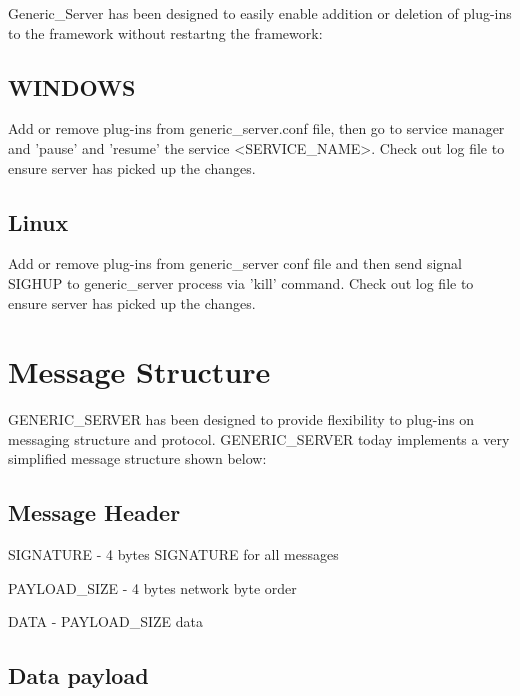 \begin{DoxyVerb}Generic_Server has been designed to easily enable addition or deletion of
plug-ins to the framework without restartng the framework:
\end{DoxyVerb}
\hypertarget{index_wi}{}\subsection{W\-I\-N\-D\-O\-W\-S}\label{index_wi}
\begin{DoxyVerb}    Add or remove plug-ins from generic_server.conf file, then go to service manager and 
    'pause' and 'resume' the service <SERVICE_NAME>. Check out log file to ensure server has
    picked up the changes.
\end{DoxyVerb}
\hypertarget{index_lii}{}\subsection{Linux}\label{index_lii}
\begin{DoxyVerb}    Add or remove plug-ins from generic_server conf file and then send signal SIGHUP to 
    generic_server process via 'kill' command. Check out log file to ensure server has
    picked up the changes.
\end{DoxyVerb}
\hypertarget{index_mp}{}\section{Message Structure}\label{index_mp}
G\-E\-N\-E\-R\-I\-C\-\_\-\-S\-E\-R\-V\-E\-R has been designed to provide flexibility to plug-\/ins on messaging structure and protocol. G\-E\-N\-E\-R\-I\-C\-\_\-\-S\-E\-R\-V\-E\-R today implements a very simplified message structure shown below\-: \hypertarget{index_hdr}{}\subsection{Message Header}\label{index_hdr}
\begin{DoxyItemize}
\item S\-I\-G\-N\-A\-T\-U\-R\-E -\/ 4 bytes S\-I\-G\-N\-A\-T\-U\-R\-E for all messages \item P\-A\-Y\-L\-O\-A\-D\-\_\-\-S\-I\-Z\-E -\/ 4 bytes network byte order \item D\-A\-T\-A -\/ P\-A\-Y\-L\-O\-A\-D\-\_\-\-S\-I\-Z\-E data \end{DoxyItemize}
\hypertarget{index_subhdr}{}\subsection{Data payload}\label{index_subhdr}

